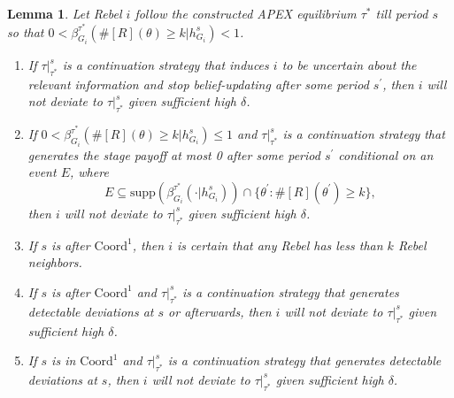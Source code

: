 \documentclass[12pt,letter]{article}
\newcommand{\Kappa}{\mathrm{Coord}}
\newtheorem{lemma}{Lemma}[section]
\theoremstyle{definition}
\theoremstyle{remark}
\theoremstyle{claim}
\begin{document}
\begin{lemma}
\label{lemma:uncertain}
Let Rebel $i$ follow the constructed APEX equilibrium $\tau^{*}$ till period $s$ so that $0<\beta^{\tau^{*}}_{G_i}(\#[R](\theta)\geq k|h^s_{G_i})<1$.
\begin{enumerate}[label=(\arabic*)]
\item If $\tau|^s_{\tau^{*}}$ is a continuation strategy that induces $i$ to be uncertain about the relevant information and stop belief-updating after some period $s^{'}$, then $i$ will not deviate to $\tau|^s_{\tau^{*}}$ given sufficient high $\delta$.
\item If $0<\beta^{\tau^{*}}_{G_i}(\#[R](\theta)\geq k|h^s_{G_i})\leq1$ and $\tau|^s_{\tau^{*}}$ is a continuation strategy that generates the stage payoff at most 0 after some period $s^{'}$ conditional on an event $E$, where 
\[E\subseteq \mathrm{supp}(\beta^{\tau^{*}}_{G_i}(\cdot |h^s_{G_i}))\cap\{\theta^{'}:\#[R](\theta^{'})\geq k\},\] 
then $i$ will not deviate to $\tau|^s_{\tau^{*}}$ given sufficient high $\delta$.
\item If $s$ is after $\Kappa^1$, then $i$ is certain that any Rebel has less than $k$ Rebel neighbors.
\item If $s$ is after $\Kappa^1$ and $\tau|^s_{\tau^{*}}$ is a continuation strategy that generates detectable deviations at $s$ or afterwards, then $i$ will not deviate to $\tau|^s_{\tau^{*}}$ given sufficient high $\delta$.
\item If $s$ is in $\Kappa^1$ and $\tau|^s_{\tau^{*}}$ is a continuation strategy that generates detectable deviations at $s$, then $i$ will not deviate to $\tau|^s_{\tau^{*}}$ given sufficient high $\delta$.
\end{enumerate}

\end{lemma}
\end{document}
